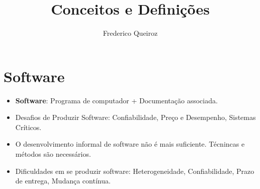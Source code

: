\documentclass[a4paper, 11pt]{article}
\author{Frederico Queiroz}
\title{Conceitos e Definições}
\begin{document}
\maketitle



\section{Software}
\begin{itemize}
	\item \textbf{Software}: Programa de computador + Documentação associada.
	\item Desafios de Produzir Software: Confiabilidade, Preço e Desempenho, Sistemas Críticos.
	\item O desenvolvimento informal de software não é mais suficiente. Técnincas e métodos são necessários.
	\item Dificuldades em se produzir software: Heterogeneidade, Confiabilidade, Prazo de entrega, Mudança contínua.
\end{itemize}
\end{document}
